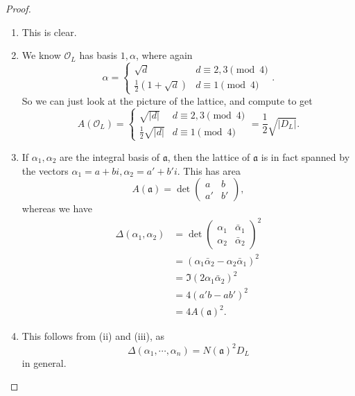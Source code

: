 \documentclass[a4paper]{article}
\begin{document}
\begin{proof}\leavevmode
  \begin{enumerate}
    \item This is clear.
    \item We know $\mathcal{O}_L$ has basis $1, \alpha$, where again
      \[
        \alpha =
        \begin{cases}
          \sqrt{d} & d \equiv 2, 3\pmod 4\\
          \frac{1}{2}(1 + \sqrt{d})& d \equiv 1 \pmod 4
        \end{cases}.
      \]
      So we can just look at the picture of the lattice, and compute to get
      \[
        A(\mathcal{O}_L) =
        \begin{cases}
          \sqrt{|d|} & d \equiv 2, 3 \pmod 4\\
          \frac{1}{2}\sqrt{|d|} & d \equiv 1\pmod 4
        \end{cases} = \frac{1}{2}\sqrt{|D_L|}.
      \]
    \item If $\alpha_1, \alpha_2$ are the integral basis of $\mathfrak{a}$, then the lattice of $\mathfrak{a}$ is in fact spanned by the vectors $\alpha_1 = a + bi, \alpha_2 = a' + b' i$. This has area
      \[
        A(\mathfrak{a}) = \det
        \begin{pmatrix}
          a & b\\
          a' & b'
        \end{pmatrix},
      \]
      whereas we have
      \begin{align*}
        \Delta(\alpha_1, \alpha_2) &=
        \det
        \begin{pmatrix}
          \alpha_1 & \bar{\alpha}_1\\
          \alpha_2 & \bar{\alpha}_2
        \end{pmatrix}^2\\
        &= (\alpha_1 \bar{\alpha}_2 - \alpha_2 \bar{\alpha}_1)^2\\
        &= \Im(2\alpha_1 \bar{\alpha}_2)^2\\
        &= 4(a'b - ab')^2\\
        &= 4A(\mathfrak{a})^2.
      \end{align*}
    \item This follows from (ii) and (iii), as
      \[
        \Delta(\alpha_1, \cdots, \alpha_n) = N(\mathfrak{a})^2 D_L
      \]
      in general.
  \end{enumerate}
\end{proof}
\end{document}
